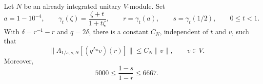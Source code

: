 \begin{proposition}\label{prop:round-annulus}
Let $N$ be an already integrated unitary $V$-module.  Set
\[
 a=1-10^{-4},\qquad
 \gamma_t(\zeta)=\frac{\zeta+t}{1+t\zeta},\qquad
 r=\gamma_t(a),\qquad s=\gamma_t(1/2),\qquad 0\leq t<1.
\]
With $\delta=r^{-1}-r$ and $q=2\delta$, there is a constant $C_N$,
independent of $t$ and $v$, such that
\begin{equation}\label{eq:uniform-round}
 \|A_{1/s,s,N}[(q^{L_0}v)(r)]\|\leq C_N\|v\|,
 \qquad v\in V.
\end{equation}
Moreover,
\begin{equation}\label{eq:round-comparable}
 5000\leq\frac{1-s}{1-r}\leq6667.
\end{equation}
\end{proposition}

